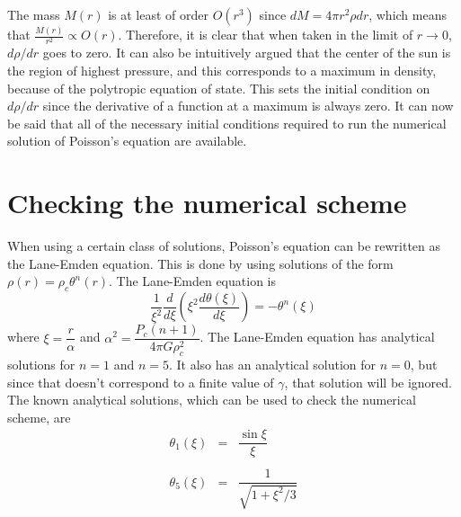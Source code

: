 \documentclass[11pt,letterpaper]{article}
\begin{document}
The mass $M\left(r\right)$ is at least of order $O\left(r^3\right)$ since
$dM = 4\pi r^2 \rho dr$, which means that
$\frac{M\left(r\right)}{r^2} \varpropto O\left(r\right)$. Therefore, it is clear
that when taken in the limit of $r \rightarrow 0$, $d\rho/dr$ goes to zero. It
can also be intuitively argued that the center of the sun is the region of
highest pressure, and this corresponds to a maximum in density, because of the
polytropic equation of state. This sets the initial condition on $d\rho/dr$
since the derivative of a function at a maximum is always zero. It can now be
said that all of the necessary initial conditions required to run the numerical
solution of Poisson's equation are available. 

\section{Checking the numerical scheme}

When using a certain class of solutions, Poisson's equation can be rewritten as
the Lane-Emden equation. This is done by using solutions of the form
$\rho\left(r\right) = \rho_c \theta^n\left(r\right)$. The Lane-Emden equation is
\cite{textbook}
\begin{equation}
    \frac{1}{\xi^2} \frac{d}{d\xi}
    \left(\xi^2\frac{d\theta\left(\xi\right)}{d\xi}\right) =
    -\theta^n\left(\xi\right)
\end{equation}
where $\xi = \dfrac{r}{\alpha}$ and
$\alpha^2 = \dfrac{P_c\left(n+1\right)}{4 \pi G \rho_c^2}$. The Lane-Emden
equation has analytical solutions for $n = 1$ and $n = 5$. It also has an
analytical solution for $n=0$, but since that doesn't correspond to a finite
value of $\gamma$, that solution will be ignored. The known analytical
solutions, which can be used to check the numerical scheme, are \cite{textbook}
\begin{equation}
    \begin{array}{rcl}
        \theta_1\left(\xi\right) & = & \dfrac{\sin\xi}{\xi} \\
        \ \\ 
        \theta_5\left(\xi\right) & = & \dfrac{1}{\sqrt{1 + \xi^2/3}} \\
    \end{array}
    \label{exact_theta}
\end{equation}
\end{document}
